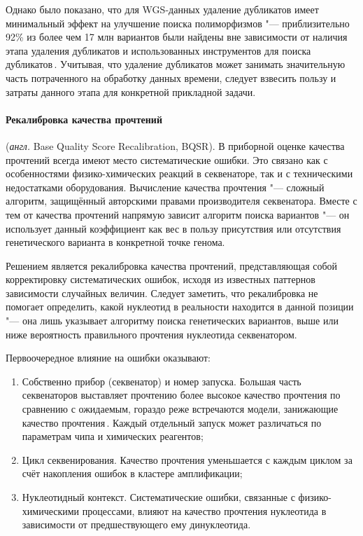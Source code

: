 \documentclass[a4paper,14pt]{extarticle}
\newcommand{\anglia}[1]{\textit{англ.} \textenglish{#1}}
\begin{document}
Однако было показано, что для WGS-данных удаление дубликатов имеет минимальный эффект на улучшение поиска полиморфизмов "--- приблизительно 92\% из более чем 17 млн вариантов были найдены вне зависимости от наличия этапа удаления дубликатов и использованных инструментов для поиска дубликатов\,\cite{Ebbert_2016}.
Учитывая, что удаление дубликатов может занимать значительную часть потраченного на обработку данных времени, следует взвесить пользу и затраты данного этапа для конкретной прикладной задачи.

\paragraph{Рекалибровка качества прочтений} (\anglia{Base Quality Score Recalibration, BQSR}).
В приборной оценке качества прочтений всегда имеют место систематические ошибки.
Это связано как с особенностями физико-химических реакций в секвенаторе, так и с техническими недостатками оборудования.
Вычисление качества прочтения "--- сложный алгоритм, защищённый авторскими правами производителя секвенатора.
Вместе с тем от качества прочтений напрямую зависит алгоритм поиска вариантов "--- он использует данный коэффициент как вес в пользу присутствия или отсутствия генетического варианта в конкретной точке генома.

Решением является рекалибровка качества прочтений, представляющая собой корректировку систематических ошибок, исходя из известных паттернов зависимости случайных величин.
Следует заметить, что рекалибровка не помогает определить, какой нуклеотид в реальности находится в данной позиции "--- она лишь указывает алгоритму поиска генетических вариантов, выше или ниже вероятность правильного прочтения нуклеотида секвенатором.

Первоочередное влияние на ошибки оказывают:

\begin{enumerate}
\item Собственно прибор (секвенатор) и номер запуска.
Большая часть секвенаторов выставляет прочтению более высокое качество прочтения по сравнению с ожидаемым, гораздо реже встречаются модели, занижающие качество прочтения\,\cite{Auwera_2013}.
Каждый отдельный запуск может различаться по параметрам чипа и химических реагентов;
\item Цикл секвенирования.
Качество прочтения уменьшается с каждым циклом за счёт накопления ошибок в кластере амплификации;
\item Нуклеотидный контекст.
Систематические ошибки, связанные с физико-химическими процессами, влияют на качество прочтения нуклеотида в зависимости от предшествующего ему динуклеотида.
\end{enumerate}
\end{document}
